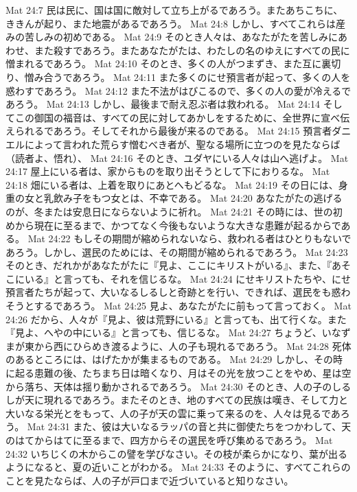 Mat 24:7  民は民に、国は国に敵対して立ち上がるであろう。またあちこちに、ききんが起り、また地震があるであろう。
Mat 24:8  しかし、すべてこれらは産みの苦しみの初めである。
Mat 24:9  そのとき人々は、あなたがたを苦しみにあわせ、また殺すであろう。またあなたがたは、わたしの名のゆえにすべての民に憎まれるであろう。
Mat 24:10  そのとき、多くの人がつまずき、また互に裏切り、憎み合うであろう。
Mat 24:11  また多くのにせ預言者が起って、多くの人を惑わすであろう。
Mat 24:12  また不法がはびこるので、多くの人の愛が冷えるであろう。
Mat 24:13  しかし、最後まで耐え忍ぶ者は救われる。
Mat 24:14  そしてこの御国の福音は、すべての民に対してあかしをするために、全世界に宣べ伝えられるであろう。そしてそれから最後が来るのである。
Mat 24:15  預言者ダニエルによって言われた荒らす憎むべき者が、聖なる場所に立つのを見たならば（読者よ、悟れ）、
Mat 24:16  そのとき、ユダヤにいる人々は山へ逃げよ。
Mat 24:17  屋上にいる者は、家からものを取り出そうとして下におりるな。
Mat 24:18  畑にいる者は、上着を取りにあとへもどるな。
Mat 24:19  その日には、身重の女と乳飲み子をもつ女とは、不幸である。
Mat 24:20  あなたがたの逃げるのが、冬または安息日にならないように祈れ。
Mat 24:21  その時には、世の初めから現在に至るまで、かつてなく今後もないような大きな患難が起るからである。
Mat 24:22  もしその期間が縮められないなら、救われる者はひとりもないであろう。しかし、選民のためには、その期間が縮められるであろう。
Mat 24:23  そのとき、だれかがあなたがたに『見よ、ここにキリストがいる』、また、『あそこにいる』と言っても、それを信じるな。
Mat 24:24  にせキリストたちや、にせ預言者たちが起って、大いなるしるしと奇跡とを行い、できれば、選民をも惑わそうとするであろう。
Mat 24:25  見よ、あなたがたに前もって言っておく。
Mat 24:26  だから、人々が『見よ、彼は荒野にいる』と言っても、出て行くな。また『見よ、へやの中にいる』と言っても、信じるな。
Mat 24:27  ちょうど、いなずまが東から西にひらめき渡るように、人の子も現れるであろう。
Mat 24:28  死体のあるところには、はげたかが集まるものである。
Mat 24:29  しかし、その時に起る患難の後、たちまち日は暗くなり、月はその光を放つことをやめ、星は空から落ち、天体は揺り動かされるであろう。
Mat 24:30  そのとき、人の子のしるしが天に現れるであろう。またそのとき、地のすべての民族は嘆き、そして力と大いなる栄光とをもって、人の子が天の雲に乗って来るのを、人々は見るであろう。
Mat 24:31  また、彼は大いなるラッパの音と共に御使たちをつかわして、天のはてからはてに至るまで、四方からその選民を呼び集めるであろう。
Mat 24:32  いちじくの木からこの譬を学びなさい。その枝が柔らかになり、葉が出るようになると、夏の近いことがわかる。
Mat 24:33  そのように、すべてこれらのことを見たならば、人の子が戸口まで近づいていると知りなさい。
